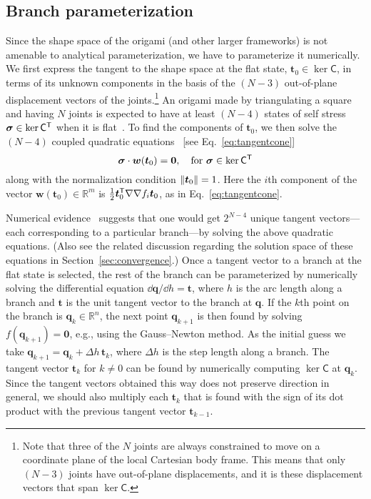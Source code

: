\subsection{Branch parameterization}

Since the shape space of the origami (and other larger frameworks) is not amenable to analytical parameterization, we have to parameterize it numerically.
We first express the tangent to the shape space at the flat state, $\bm{t}_{0} \in \ker \mathsf{C}$, in terms of its unknown components in the basis of the $(N - 3)$ out-of-plane displacement vectors of the joints.\footnote{Note that three of the $N$ joints are always constrained to move on a coordinate plane of the local Cartesian body frame.  This means that only $(N - 3)$ joints have out-of-plane displacements, and it is these displacement vectors that span $\ker\mathsf{C}$.}
An origami made by triangulating a square and having $N$ joints is expected to have at least $(N - 4)$ states of self stress $\bm{\sigma} \in \ker\mathsf{C}^\mathsf{T}$ when it is flat~\cite{chen2018}.
To find the components of $\bm{t}_{0}$, we then solve the $(N - 4)$ coupled quadratic equations~\cite{tarnai2001,chen2018} [see Eq.~\eqref{eq:tangentcone}]
%
\begin{equation}
  \bm{\sigma}\cdot\bm{w}(\bm{t}_{0}) = \bm{0},\quad \text{for } \bm{\sigma} \in \ker{\mathsf{C}\ensuremath{^\mathsf{T}}}
  \label{eq:quadratic}
\end{equation}
%
along with the normalization condition $\lVert\bm{t}_{0}\rVert = 1$.
Here the $i$th component of the vector $\bm{w}(\bm{t}_{0}) \in \mathbb{R}^{m}$ is $\frac{1}{2}\bm{t}_{0}^\mathsf{T} \nabla\nabla f_{i} \bm{t}_{0}$, as in Eq.~\eqref{eq:tangentcone}. %

Numerical evidence~\cite{chen2018} suggests that one would get $2^{N-4}$ unique tangent vectors---each corresponding to a particular branch---by solving the above quadratic equations.
(Also see the related discussion regarding the solution space of these equations in Section~\ref{sec:convergence}.)
Once a tangent vector to a branch at the flat state is selected, the rest of the branch can be parameterized by numerically solving the differential equation $\dd\bm{q}/\dd{h} = \bm{t}$, where $h$ is the arc length along a branch and $\bm{t}$ is the unit tangent vector to the branch at $\bm{q}$.
If the $k$th point on the branch is $\bm{q}_k \in \mathbb{R}^{n}$, the next point $\bm{q}_{k+1}$ is then found by solving $f(\bm{q}_{k+1}) = \bm{0}$, e.g., using the Gauss--Newton method.
As the initial guess we take $\bm{q}_{k+1} = \bm{q}_{k} + \Delta h\,\bm{t}_{k}$, where $\Delta h$ is the step length along a branch.
The tangent vector $\bm{t}_k$ for $k \ne 0$ can be found by numerically computing $\ker\mathsf{C}$ at $\bm{q}_k$.
Since the tangent vectors obtained this way does not preserve direction in general, we should also multiply each $\bm{t}_k$ that is found with the sign of its dot product with the previous tangent vector $\bm{t}_{k-1}$.

